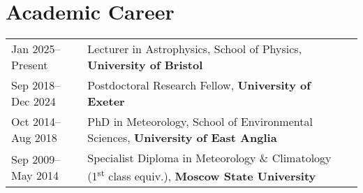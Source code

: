 \documentclass[a4paper, 11pt]{article}
\begin{document}
\thispagestyle{empty}

\keepXColumns



\section{Academic Career}
\begin{tabularx}{\linewidth}{@{}l X@{}}
Jan 2025--Present  & Lecturer in Astrophysics, School of Physics, \textbf{University of Bristol} \\
Sep 2018--Dec 2024 & Postdoctoral Research Fellow, \textbf{University of Exeter} \\
Oct 2014--Aug 2018 & PhD in Meteorology, School of Environmental Sciences, \textbf{University of East Anglia} \\
Sep 2009--May 2014 & Specialist Diploma in Meteorology \& Climatology (1\textsuperscript{st} class equiv.), \textbf{Moscow State University}  \\
\end{tabularx}

\end{document}
